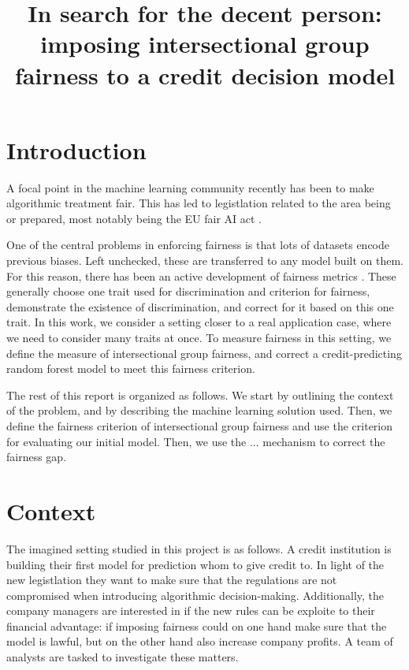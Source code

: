 \documentclass{article}
\title{In search for the decent person: imposing intersectional group fairness to a credit decision model}
\begin{document}
\maketitle

\section*{Introduction}

A focal point in the machine learning community recently has 
been to make algorithmic treatment fair. This has led to legistlation related 
to the area being or prepared, most notably being the EU fair AI act \cite{Aiact}.

One of the central problems in enforcing fairness is that
 lots of datasets encode previous biases. Left 
unchecked, these are transferred to any model built on them. For this reason,
there has been an active development of fairness metrics \cite{stanley}.
These generally choose one trait used for discrimination and criterion for fairness, demonstrate 
the existence of discrimination, and correct for it based on this one trait.
In this work, we consider a setting closer to a real application case, where 
we need to consider many traits at once. To measure fairness in this setting, 
we define the measure of intersectional group fairness, and correct a 
credit-predicting random forest model to meet this fairness criterion.

The rest of this report is organized as follows. We start by outlining the 
context of the problem, and by describing the machine learning solution used.
Then, we define the fairness criterion of intersectional group fairness and 
use the criterion for evaluating our initial model. Then, we use the ... 
mechanism to correct the fairness gap.

\section*{Context}

The imagined setting studied in this project is as follows. 
A credit institution is building their first model for prediction whom to give credit to.
In light of the new legistlation they want to 
make sure that the regulations are not compromised when introducing 
algorithmic decision-making. Additionally, the company managers are interested 
in if the new rules can be exploite to their financial advantage: if 
imposing fairness could on one hand make sure that the model is lawful, but on 
the other hand also increase company profits. A team of analysts are 
tasked to investigate these matters.
\end{document}
